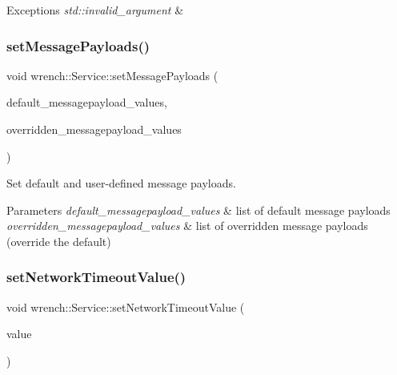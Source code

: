 \begin{DoxyExceptions}{Exceptions}
{\em std\+::invalid\+\_\+argument} & \\
\hline
\end{DoxyExceptions}
\mbox{\label{classwrench_1_1_service_a9ec41132539247584c2878c6dc18f34e}} 
\subsubsection{\texorpdfstring{set\+Message\+Payloads()}{setMessagePayloads()}}
{\footnotesize\ttfamily void wrench\+::\+Service\+::set\+Message\+Payloads (\begin{DoxyParamCaption}\item[{std\+::map$<$ std\+::string, std\+::string $>$}]{default\+\_\+messagepayload\+\_\+values,  }\item[{std\+::map$<$ std\+::string, std\+::string $>$}]{overridden\+\_\+messagepayload\+\_\+values }\end{DoxyParamCaption})\hspace{0.3cm}{\ttfamily [protected]}}



Set default and user-\/defined message payloads. 


\begin{DoxyParams}{Parameters}
{\em default\+\_\+messagepayload\+\_\+values} & list of default message payloads \\
\hline
{\em overridden\+\_\+messagepayload\+\_\+values} & list of overridden message payloads (override the default) \\
\hline
\end{DoxyParams}
\mbox{\label{classwrench_1_1_service_a2bdf99201280d83b44a03c0b78ebdf90}} 
\subsubsection{\texorpdfstring{set\+Network\+Timeout\+Value()}{setNetworkTimeoutValue()}}
{\footnotesize\ttfamily void wrench\+::\+Service\+::set\+Network\+Timeout\+Value (\begin{DoxyParamCaption}\item[{double}]{value }\end{DoxyParamCaption})}



